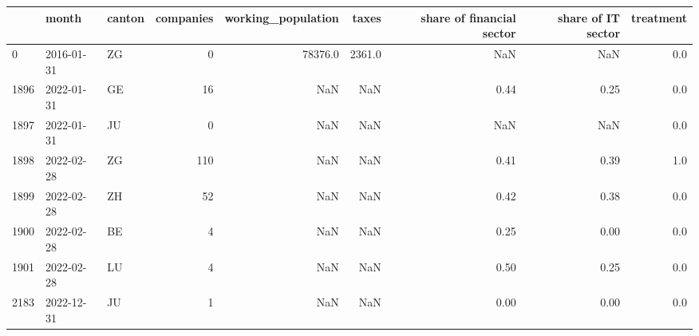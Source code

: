 \begin{tabular}{lllrrrrrr}
\toprule
{} &      month & canton &  companies &  working\_population &   taxes &  share of financial sector &  share of IT sector &  treatment \\
\midrule
0    & 2016-01-31 &     ZG &          0 &             78376.0 &  2361.0 &                        NaN &                 NaN &        0.0 \\
1896 & 2022-01-31 &     GE &         16 &                 NaN &     NaN &                       0.44 &                0.25 &        0.0 \\
1897 & 2022-01-31 &     JU &          0 &                 NaN &     NaN &                        NaN &                 NaN &        0.0 \\
1898 & 2022-02-28 &     ZG &        110 &                 NaN &     NaN &                       0.41 &                0.39 &        1.0 \\
1899 & 2022-02-28 &     ZH &         52 &                 NaN &     NaN &                       0.42 &                0.38 &        0.0 \\
1900 & 2022-02-28 &     BE &          4 &                 NaN &     NaN &                       0.25 &                0.00 &        0.0 \\
1901 & 2022-02-28 &     LU &          4 &                 NaN &     NaN &                       0.50 &                0.25 &        0.0 \\
2183 & 2022-12-31 &     JU &          1 &                 NaN &     NaN &                       0.00 &                0.00 &        0.0 \\
\bottomrule
\end{tabular}

